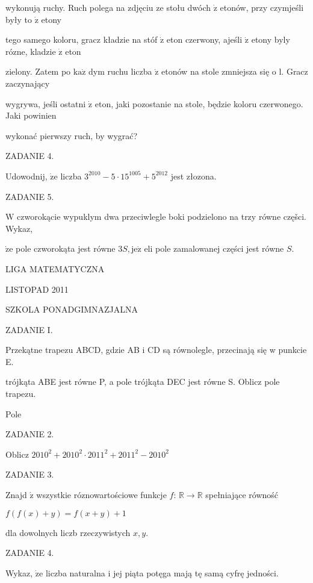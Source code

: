\documentclass[a4paper,12pt]{article}
\begin{document}
wykonują ruchy. Ruch polega na zdjęciu ze stołu dwóch $\dot{\mathrm{z}}$ etonów, przy czymjeśli były to $\dot{\mathrm{z}}$ etony

tego samego koloru, gracz kładzie na stóf $\dot{\mathrm{z}}$ eton czerwony, ajeśli $\dot{\mathrm{z}}$ etony byly rózne, kladzie $\dot{\mathrm{z}}$ eton

zielony. Zatem po $\mathrm{k}\mathrm{a}\dot{\mathrm{z}}$ dym ruchu liczba $\dot{\mathrm{z}}$ etonów na stole zmniejsza się o l. Gracz zaczynający

wygrywa, jeśli ostatni $\dot{\mathrm{z}}$ eton, jaki pozostanie na stole, będzie koloru czerwonego. Jaki powinien

wykonać pierwszy ruch, by wygrać?

ZADANIE 4.

Udowodnij, $\dot{\mathrm{z}}\mathrm{e}$ liczba $3^{2010}-5\cdot 15^{1005}+5^{2012}$ jest złozona.

ZADANIE 5.

$\mathrm{W}$ czworokącie wypuklym dwa przeciwlegle boki podzielono na trzy równe częšci. Wykaz,

$\dot{\mathrm{z}}\mathrm{e}$ pole czworokąta jest równe $3S, \mathrm{j}\mathrm{e}\dot{\mathrm{z}}$ eli pole zamalowanej części jest równe $S.$






LIGA MATEMATYCZNA

LISTOPAD 2011

SZKOLA PONADGIMNAZJALNA

ZADANIE I.

Przekątne trapezu ABCD, gdzie AB i CD są równolegle, przecinają się w punkcie E.

trójkąta ABE jest równe P, a pole trójkąta DEC jest równe S. Oblicz pole trapezu.

Pole

ZADANIE 2.

Oblicz $2010^{2}+2010^{2}\cdot 2011^{2}+2011^{2}-2010^{2}$

ZADANIE 3.

Znajd $\acute{\mathrm{z}}$ wszystkie róznowartościowe funkcje $f$: $\mathbb{R}\rightarrow \mathbb{R}$ spełniające równość

$f(f(x)+y)=f(x+y)+1$

dla dowolnych liczb rzeczywistych $x, y.$

ZADANIE 4.

Wykaz, $\dot{\mathrm{z}}\mathrm{e}$ liczba naturalna i jej piąta potęga mają tę samą cyfrę jedności.
\end{document}

